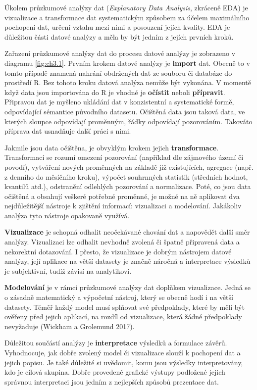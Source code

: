 \documentclass[12pt,]{article}
\begin{document}
\qquad Úkolem průzkumové analýzy dat (\emph{Explanatory Data Analysis},
zkráceně EDA) je vizualizace a transformace dat systematickým způsobem
za účelem maximálního pochopení dat, určení vztahu mezi nimi a posouzení
jejích kvality. EDA je důležitou části datové analýzy a měla by být
jedním z jejích prvních kroků.

\qquad Zařazení průzkumové analýzy dat do procesu datové analýzy je
zobrazeno v diagramu \ref{fig:ch3.1}. Prvním krokem datové analýzy je
\textbf{import} dat. Obecně to v tomto případě znamená nahrání
obdržených dat ze souboru či databáze do prostředí R. Bez tohoto kroku
datová analýza nemůže být vykonána. V momentě když data jsou importována
do R je vhodné je \textbf{očístit} neboli \textbf{přípravit}. Připravou
dat je myšleno ukládání dat v konzistentní a systematické formě,
odpovídající sémantice původního datasetu. Očištěná data jsou taková
data, ve kterých sloupce odpovídají proměnným, řádky odpovídají
pozorováním. Takováto příprava dat usnadňuje další práci s nimi.

\qquad Jakmile jsou data očištěna, je obvyklým krokem jejich
\textbf{transformace}. Transformací se rozumí omezení pozorování
(například dle zájmového území či povodí), vytváření nových proměnných
na základě již existujících, agregace (např. z denního do měsíčního
kroku), výpočet souhrnných statistik (středních hodnot, kvantilů atd.),
odstranění odlehlých pozorování a normalizace. Poté, co jsou data
očištěná a obsahují veškeré potřebné proměnné, je možné na ně aplikovat
dva nejdůležitější nástroje k zjištění informací: vizualizaci a
modelování. Jakákoliv analýza tyto nástroje opakovaně využívá.

\qquad \textbf{Vizualizace} je schopná odhalit neočekávané chování dat a
napovědět další směr analýzy. Vizualizaci lze odhalit nevhodně zvolená
či špatně připravená data a nekorektní dotazování. I přesto, že
vizualizace je dobrým nástrojem datové analýzy, její aplikace na větší
datasety je značně náročná a interpretace výsledků je subjektivní, tudíž
závisí na analytikovi.

\qquad \textbf{Modelování} je v rámci průzkumové analýzy dat doplňkem
vizualizace. Jedná se o zásadně matematický a výpočetní nástroj, který
se obecně hodí i na větší datasety. Téměř každý model musí splňovat své
předpoklady, které by měli být ověřeny před jejich aplikací, na rozdíl
od vizualizace, která žádné předpoklady nevyžaduje (Wickham a Grolemund
2017).

\qquad Důležitou součástí analýzy je \textbf{interpretace} výsledků a
formulace závěrů. Vyhodnocuje, jak dobře zvolený model či vizualizace
slouží k pochopení dat a jejich popisu. Je také důležité si uvědomit,
komu jsou výsledky interpretovány, kdo je cílová skupina. Dobře
provedené grafické výstupy podložené jejich správnou interpretaci jsou
jedním z nejlepších způsobů prezentace dat.
\end{document}
